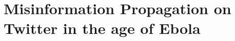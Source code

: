 
\chapter{Misinformation Propagation on Twitter in the age of Ebola}

\begingroup
\newcommand{\score}{S}
\newcommand{\myalgo}{CoolAlgo}


%







\endgroup
